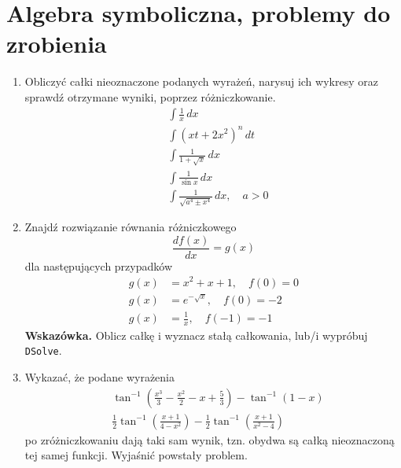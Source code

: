 \documentclass[a4paper,11pt]{article}
\begin{document}
\section{Algebra symboliczna, problemy do zrobienia}





\begin{enumerate}

\item Obliczyć całki nieoznaczone podanych wyrażeń, narysuj ich
  wykresy oraz sprawdź otrzymane wyniki, poprzez różniczkowanie.
  \begin{align}
    &\int \frac{ 1 }{ x } \, dx \\
    &\int ( xt + 2x^{ 2 } )^{ n } \, dt \\
    &\int \frac{ 1 }{ 1 + \sqrt{ x } } \, dx \\
    &\int \frac{ 1 }{ \sin x } \, dx \\
    &\int \frac{ 1 }{ \sqrt{ a^{ 4 } \pm x^{ 4 } } } \, dx, \quad
      a > 0
  \end{align}

\item Znajdź rozwiązanie równania różniczkowego
  \begin{equation}
    \label{eq:6}
    \frac{ d f( x ) }{ dx } = g( x )
  \end{equation}
  dla następujących przypadków
  \begin{align}
    g( x ) &= x^{ 2 } + x + 1, \quad
             f( 0 ) = 0 \\
    g( x ) &= e^{ -\sqrt{ x } }, \quad
             f( 0 ) = -2 \\
    g( x ) &= \frac{ 1 }{ x }, \quad
             f( -1 ) = -1
  \end{align}
  \textbf{Wskazówka.} Oblicz całkę i wyznacz stałą całkowania, lub/i
  wypróbuj \texttt{DSolve}.


\item Wykazać, że podane wyrażenia
  \begin{align}
    &\tan^{ -1 }\left( \frac{ x^{ 3 } }{ 3 } - \frac{ x^{ 2 } }{ 2 }
      - x + \frac{ 5 }{ 3 } \right)
      - \tan^{ -1 }( 1 - x ) \\
    &\frac{ 1 }{ 2 } \tan^{ -1 }\left( \frac{ x + 1 }{ 4 - x^{ 2 } } \right)
      - \frac{ 1 }{ 2 } \tan^{ -1 }\left( \frac{ x + 1 }{ x^{ 2 } - 4 }
      \right)
  \end{align}
  po zróżniczkowaniu dają taki sam wynik, tzn. obydwa są całką
  nieoznaczoną tej samej funkcji. Wyjaśnić powstały problem.


\end{enumerate}
\end{document}
